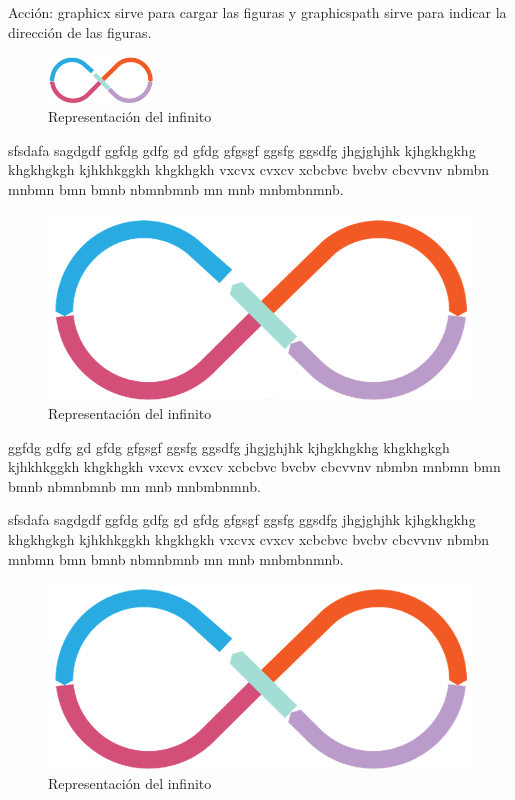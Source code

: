 \documentclass[a4paper, 12pt]{article}
\begin{document}
\begin{flushleft}
		Acción: graphicx sirve para cargar las figuras y graphicspath sirve para indicar la dirección de las figuras.\newline
		
		\begin{figure}[h]
			\centering
			\includegraphics[width=0.25\textwidth]{flujo}
			\caption{Representación del infinito}
			\label{fig:flujo1}
		\end{figure}
		
		\begin{minipage}{0.99\textwidth}
			
			sfsdafa sagdgdf ggfdg gdfg gd gfdg gfgsgf ggsfg ggsdfg jhgjghjhk kjhgkhgkhg khgkhgkgh kjhkhkggkh khgkhgkh vxcvx cvxcv xcbcbvc bvcbv cbcvvnv nbmbn mnbmn bmn bmnb nbmnbmnb mn mnb mnbmbnmnb.
			
			\begin{figure}
				\centering
				\includegraphics[width=0.9\linewidth]{flujo}
				\caption{Representación del infinito}
				\label{fig:flujo2}
			\end{figure}
			
			ggfdg gdfg gd gfdg gfgsgf ggsfg ggsdfg jhgjghjhk kjhgkhgkhg khgkhgkgh kjhkhkggkh khgkhgkh vxcvx cvxcv xcbcbvc bvcbv cbcvvnv nbmbn mnbmn bmn bmnb nbmnbmnb mn mnb mnbmbnmnb.
			
			sfsdafa sagdgdf ggfdg gdfg gd gfdg gfgsgf ggsfg ggsdfg jhgjghjhk kjhgkhgkhg khgkhgkgh kjhkhkggkh khgkhgkh vxcvx cvxcv xcbcbvc bvcbv cbcvvnv nbmbn mnbmn bmn bmnb nbmnbmnb mn mnb mnbmbnmnb.
			
			\begin{figure}
				\centering
				\includegraphics[width=0.9\linewidth]{flujo}
				\caption{Representación del infinito}
				\label{fig:flujo3}
			\end{figure}
			

\end{minipage}
\end{flushleft}
\end{document}
